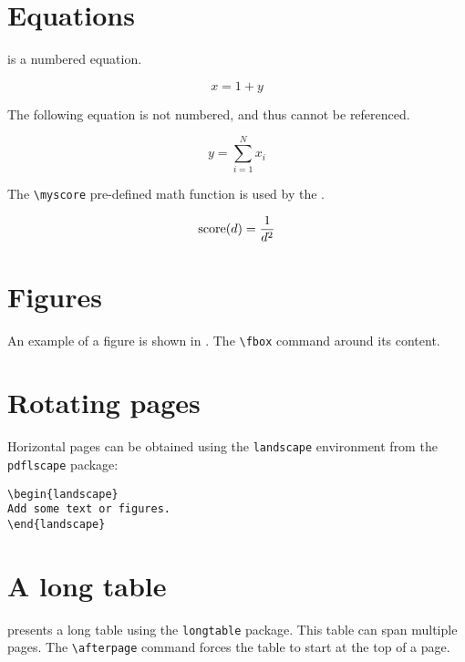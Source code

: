 \section{Equations}
\label{sec:equations}

 is a numbered equation.

\begin{equation}
\label{eq:example1}
x = 1 + y
\end{equation}

The following equation is not numbered, and thus cannot be referenced.

\begin{equation*}
y = \sum_{i=1}^{N}{x_i}
\end{equation*}

The \verb+\myscore+ pre-defined math function is used by the .

\begin{equation}
\label{eq:example2}
\operatorname{score}(d) = \frac{1}{d^2}
\end{equation}

\section{Figures}
\label{sec:figures}

An example of a figure is shown in . The \verb+\fbox+ command  around its content.



\section{Rotating pages}
\label{sec:rotating-pages}

Horizontal pages can be obtained using the \verb+landscape+ environment  from the \verb+pdflscape+ package:

\begin{verbatim}
\begin{landscape}
Add some text or figures.
\end{landscape}
\end{verbatim}

\section{A long table}
\label{sec:a-long-table}

 presents a long table using the \verb+longtable+ package. This table can span multiple pages. The \verb+\afterpage+ command forces the table to start at the top of a page.

\afterpage{}
